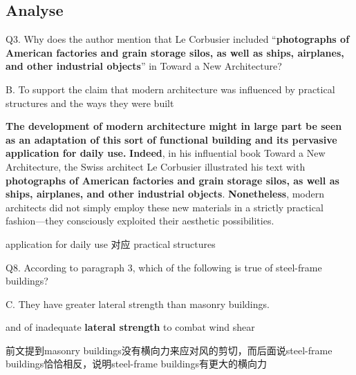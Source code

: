 \subsection{Analyse}

\begin{blk}
    \begin{qst}
        Q3. Why does the author mention that Le Corbusier included “\textbf{photographs of American factories and grain storage silos, as well as ships, airplanes, and other industrial objects}” in Toward a New Architecture?
    \end{qst}

    \begin{chc}
        B. To support the claim that modern architecture was influenced by practical structures and the ways they were built
    \end{chc}

    \begin{psgq}
        \textbf{The development of modern architecture might in large part be seen as an adaptation of this sort of functional building and its pervasive application for daily use.} \textbf{Indeed}, in his influential book Toward a New Architecture, the Swiss architect Le Corbusier illustrated his text with \textbf{photographs of American factories and grain storage silos, as well as ships, airplanes, and other industrial objects}. \textbf{Nonetheless}, modern architects did not simply employ these new materials in a strictly practical fashion—they consciously exploited their aesthetic possibilities.
    \end{psgq}

    \begin{nlz}
        application for daily use 对应 practical structures
    \end{nlz}
\end{blk}

\begin{blk}
    \begin{qst}
        Q8. According to paragraph 3, which of the following is true of steel-frame buildings?
    \end{qst}

    \begin{chc}
        C. They have greater lateral strength than masonry buildings.
    \end{chc}

    \begin{psgq}
        and of inadequate \textbf{lateral strength} to combat wind shear
    \end{psgq}

    \begin{nlz}
        前文提到masonry buildings没有横向力来应对风的剪切，而后面说steel-frame buildings恰恰相反，说明steel-frame buildings有更大的横向力
    \end{nlz}
\end{blk}

